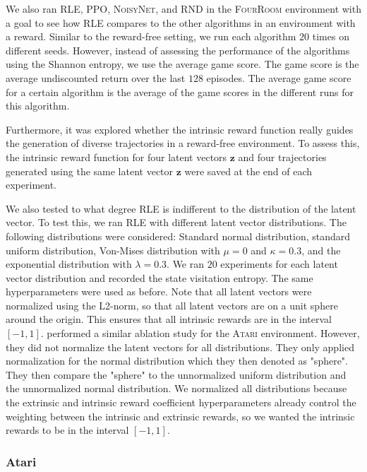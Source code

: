 \documentclass[10pt]{article} %
\begin{document}
We also ran \textsc{RLE}, \textsc{PPO}, \textsc{NoisyNet}, and \textsc{RND} in the \textsc{FourRoom} environment with a goal to see how \textsc{RLE} compares to the other algorithms in an environment with a reward. Similar to the reward-free setting, we run each algorithm $20$ times on different seeds. However, instead of assessing the performance of the algorithms using the Shannon entropy, we use the average game score. The game score is the average undiscounted return over the last $128$ episodes. The average game score for a certain algorithm is the average of the game scores in the different runs for this algorithm.

Furthermore, it was explored whether the intrinsic reward function really guides the generation of diverse trajectories in a reward-free environment. To assess this, the intrinsic reward function for four latent vectors $\textbf{z}$ and four trajectories generated using the same latent vector $\textbf{z}$ were saved at the end of each experiment. 

We also tested to what degree \textsc{RLE} is indifferent to the distribution of the latent vector. To test this, we ran \textsc{RLE} with different latent vector distributions. The following distributions were considered: Standard normal distribution, standard uniform distribution, Von-Mises distribution with $\mu=0$ and $\kappa=0.3$, and the exponential distribution with $\lambda=0.3$. We ran $20$ experiments for each latent vector distribution and recorded the state visitation entropy. The same hyperparameters were used as before. Note that all latent vectors were normalized using the L2-norm, so that all latent vectors are on a unit sphere around the origin. This ensures that all intrinsic rewards are in the interval $[-1,1]$. \cite{rle-paper} performed a similar ablation study for the \textsc{Atari} environment. However, they did not normalize the latent vectors for all distributions. They only applied normalization for the normal distribution which they then denoted as "sphere". They then compare the "sphere" to the unnormalized uniform distribution and the unnormalized normal distribution. We normalized all distributions because the extrinsic and intrinsic reward coefficient hyperparameters already control the weighting between the intrinsic and extrinsic rewards, so we wanted the intrinsic rewards to be in the interval $[-1,1]$.

\subsubsection{Atari}
\end{document}
